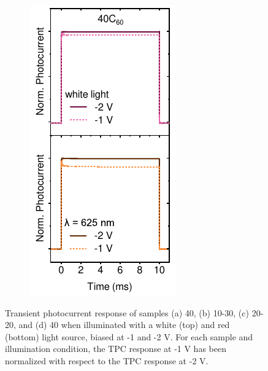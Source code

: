 \begin{figure}[htbp]
\begin{subfigure}{0.24\textwidth}
        \caption{}
        \label{}
    \end{subfigure}
    \hfill
    \begin{subfigure}{0.24\textwidth}
        \centering
        \includegraphics[width=\textwidth]{chapters/transport_layers/images/TPC_40C60.pdf}
        \caption{}
        \label{}
    \end{subfigure}
    
    \caption{Transient photocurrent response of samples (a) 40, (b) 10-30, (c) 20-20, and (d) 40 when illuminated with a white (top) and red (bottom) light source, biased at -1 and -2 V. For each sample and illumination condition, the TPC response at -1 V has been normalized with respect to the TPC response at -2 V.}
    \label{fig:etl_opt:tpc_comparison}
\end{figure}


